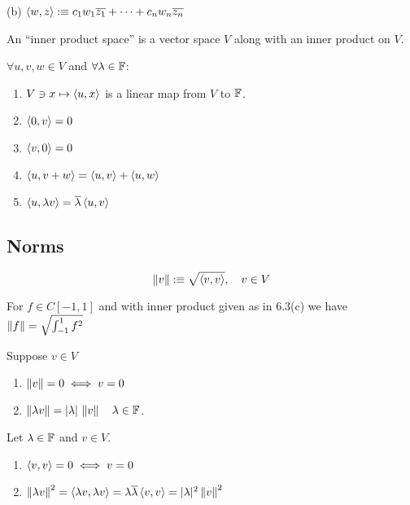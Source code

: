 \begin{example}
  (b) $\left \langle w, z \right \rangle :\equiv c_1 w_1 \overline{z_1} + \cdots + c_n w_n \overline{z_n}$
\end{example}

\begin{mydef}
  An ``inner product space'' is a vector space $V$ along with an inner product on $V$.
\end{mydef}

\setcounter{thm}{5}

\begin{thm}
  $\forall u,v,w \in V$ and $\forall \lambda \in \mathbb{F}$:  
  \begin{enumerate}[label=(\alph*)]
    \item $V \ni x \mapsto \left \langle u, x \right \rangle$ is a linear map from $V$ to $\mathbb{F}$.
    \item $\left \langle 0, v \right \rangle = 0 $
    \item $\left \langle v, 0 \right \rangle = 0$
    \item $\left \langle u, v+w \right \rangle = \left \langle u, v \right \rangle + \left \langle u, w \right \rangle $
    \item $\left \langle u, \lambda v \right \rangle = \overline{\lambda} \left \langle u, v \right \rangle$
  \end{enumerate}
\end{thm}

\subsection{Norms}

\begin{mydef} [norm]
  \begin{equation}
    \left \lVert v \right \rVert :\equiv \sqrt{\left \langle v, v \right \rangle}, \quad v \in  V
  \end{equation}
\end{mydef}

\begin{example}
  For $f \in C[-1,1]$ and with inner product given as in 6.3(c) we have $\left \lVert f \right \rVert = \sqrt { \int_{-1}^{1} f^2}$

\end{example}

\begin{thm} 
  Suppose $v \in V$
  \begin{enumerate}[label=(\alph*)]
    \item $\left \lVert v \right \rVert = 0 \iff v = 0$
    \item $\left \lVert \lambda v \right \rVert = |\lambda| \,\left \lVert v \right \rVert \quad \lambda \in \mathbb{F}$.
  \end{enumerate}
\end{thm}
\begin{prf}
  Let $\lambda \in \mathbb{F}$ and $v \in V$.
  \begin{enumerate}[label=(\alph*)]
    \item $\left \langle v, v \right \rangle = 0 \iff v=0$
    \item $\left \lVert \lambda v \right \rVert^2 = \left \langle \lambda v, \lambda v \right \rangle = \lambda \overline{\lambda} \left \langle v, v \right \rangle = |\lambda|^2 \left \lVert v \right \rVert^2$
  \end{enumerate}
  \vspace{-1em}
\end{prf}

